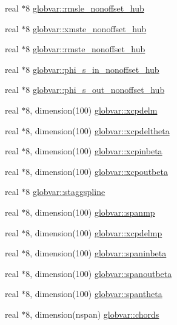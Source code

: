 \begin{DoxyCompactItemize}
\item 
real $\ast$8 \hyperlink{namespaceglobvar_a5237bcbafe8fc6ccd929edfff7448b15}{globvar\+::rmsle\+\_\+nonoffset\+\_\+hub}
\item 
real $\ast$8 \hyperlink{namespaceglobvar_aafc2848897bd0aa446e292955157bb99}{globvar\+::xmste\+\_\+nonoffset\+\_\+hub}
\item 
real $\ast$8 \hyperlink{namespaceglobvar_ac10c9231253c0f30759eab0d2614b736}{globvar\+::rmste\+\_\+nonoffset\+\_\+hub}
\item 
real $\ast$8 \hyperlink{namespaceglobvar_a1f20572185fb4ba6325b2158c570f2b8}{globvar\+::phi\+\_\+s\+\_\+in\+\_\+nonoffset\+\_\+hub}
\item 
real $\ast$8 \hyperlink{namespaceglobvar_ae4db55071c0a99b6d91729452cf5e5bc}{globvar\+::phi\+\_\+s\+\_\+out\+\_\+nonoffset\+\_\+hub}
\item 
real $\ast$8, dimension(100) \hyperlink{namespaceglobvar_a7da205f9d2f93c70b889e9da9c9ac03a}{globvar\+::xcpdelm}
\item 
real $\ast$8, dimension(100) \hyperlink{namespaceglobvar_a53a66282b3eaeda7202704473994f279}{globvar\+::xcpdeltheta}
\item 
real $\ast$8, dimension(100) \hyperlink{namespaceglobvar_ade9c76fcb375c4e5d05a6d9c04c1dbfe}{globvar\+::xcpinbeta}
\item 
real $\ast$8, dimension(100) \hyperlink{namespaceglobvar_aa9e6a5ee3e0ace429ff2ebc6f8c04ed2}{globvar\+::xcpoutbeta}
\item 
real $\ast$8 \hyperlink{namespaceglobvar_abf2b9f230322f087169e3c845b003237}{globvar\+::staggspline}
\item 
real $\ast$8, dimension(100) \hyperlink{namespaceglobvar_a9e37b92991bd90ec55563a14f0405156}{globvar\+::spanmp}
\item 
real $\ast$8, dimension(100) \hyperlink{namespaceglobvar_ad1fdc8c08d0045d1d9088325d56d0a7f}{globvar\+::xcpdelmp}
\item 
real $\ast$8, dimension(100) \hyperlink{namespaceglobvar_a9b67a74e3faac41a7e1cc636aa467efb}{globvar\+::spaninbeta}
\item 
real $\ast$8, dimension(100) \hyperlink{namespaceglobvar_a7ce1073506dd3e70987eab670a28928d}{globvar\+::spanoutbeta}
\item 
real $\ast$8, dimension(100) \hyperlink{namespaceglobvar_a9a59ebb9cb5ab3b30e153f7b8c129c09}{globvar\+::spantheta}
\item 
real $\ast$8, dimension(nspan) \hyperlink{namespaceglobvar_a103f2629767cb895acfd77c69b4fdcd2}{globvar\+::chords}

\end{DoxyCompactItemize}
